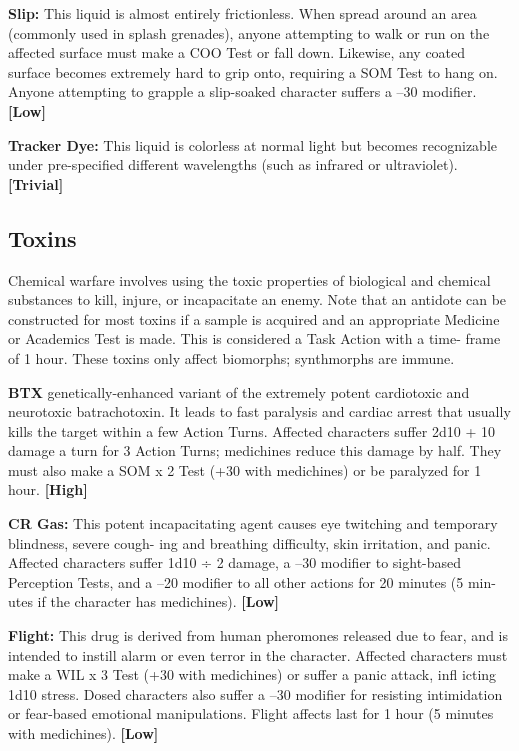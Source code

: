 \textbf{Slip:} This liquid is almost entirely frictionless. When 
spread around an area (commonly used in splash 
grenades), anyone attempting to walk or run on the 
affected surface must make a COO Test or fall down. 
Likewise, any coated surface becomes extremely 
hard to grip onto, requiring a SOM Test to hang on. 
Anyone attempting to grapple a slip-soaked character 
suffers a –30 modifier. \textbf{[Low]}

\textbf{Tracker Dye:} This liquid is colorless at normal light 
but becomes recognizable under pre-specified different 
wavelengths (such as infrared or ultraviolet). \textbf{[Trivial]}

\subsection{Toxins}

Chemical warfare involves using the toxic properties 
of biological and chemical substances to kill, injure, 
or incapacitate an enemy. Note that an antidote can 
be constructed for most toxins if a sample is acquired 
and an appropriate Medicine or Academics Test is 
made. This is considered a Task Action with a time-
frame of 1 hour. These toxins only affect biomorphs; 
synthmorphs are immune.

\textbf{BTX}
genetically-enhanced variant of the extremely potent 
cardiotoxic and neurotoxic batrachotoxin. It leads to 
fast paralysis and cardiac arrest that usually kills the 
target within a few Action Turns. Affected characters 
suffer 2d10 + 10 damage a turn for 3 Action Turns; 
medichines reduce this damage by half. They must 
also make a SOM x 2 Test (+30 with medichines) or 
be paralyzed for 1 hour. \textbf{[High]}

\textbf{CR Gas:} This potent incapacitating agent causes 
eye twitching and temporary blindness, severe cough-
ing and breathing difficulty, skin irritation, and panic. 
Affected characters suffer 1d10 ÷ 2 damage, a –30 
modifier to sight-based Perception Tests, and a –20 
modifier to all other actions for 20 minutes (5 min-
utes if the character has medichines). \textbf{[Low]}

\textbf{Flight:} This drug is derived from human pheromones 
released due to fear, and is intended to instill alarm or 
even terror in the character. Affected characters must 
make a WIL x 3 Test (+30 with medichines) or suffer 
a panic attack, infl icting 1d10 stress. Dosed characters 
also suffer a –30 modifier for resisting intimidation or 
fear-based emotional manipulations. Flight affects last 
for 1 hour (5 minutes with medichines). \textbf{[Low]}

